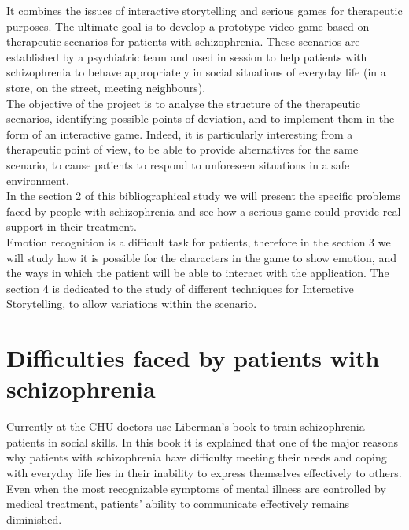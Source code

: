 \documentclass[11pt]{article}
\begin{document}
It combines the issues of interactive storytelling and serious games for therapeutic purposes. The ultimate goal is to develop a prototype video game based on therapeutic scenarios for patients with schizophrenia. These scenarios are established by a psychiatric team and used in session to help patients with schizophrenia to behave appropriately in social situations of everyday life (in a store, on the street, meeting neighbours). \\

The objective of the project is to analyse the structure of the therapeutic scenarios, identifying possible points of deviation, and to implement them in the form of an interactive game. Indeed, it is particularly interesting from a therapeutic point of view, to be able to provide alternatives for the same scenario, to cause patients to respond to unforeseen situations in a safe environment.\\

In the section 2 of this bibliographical study we will present the specific problems faced by people with schizophrenia and see how a serious game could provide real support in their treatment. \\
Emotion recognition is a difficult task for patients, therefore in the section 3 we will study how it is possible for the characters in the game to show emotion, and the ways in which the patient will be able to interact with the application. The section 4 is dedicated to the study of different techniques for Interactive Storytelling, to allow variations within the scenario.
\section{Difficulties faced by patients with schizophrenia}
Currently at the CHU doctors use Liberman's book \cite{Liberman05} to train schizophrenia patients in social skills. In this book it is explained that one of the major reasons why patients with schizophrenia have difficulty meeting their needs and coping with everyday life lies in their inability to express themselves effectively to others. Even when the most recognizable symptoms of mental illness are controlled by medical treatment, patients' ability to communicate effectively remains diminished.
\end{document}
